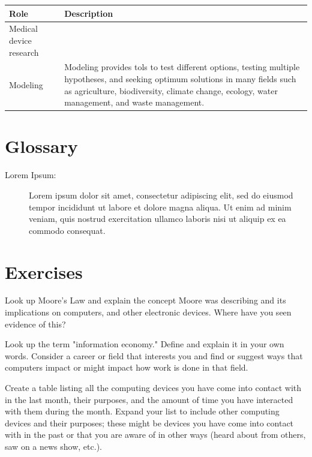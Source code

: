 \begin{table}[H]
	\begin{center}
		\begin{tabular}{p{1.3in}|p{3in}} 
			\textbf{Role} & \textbf{Description}\\
			\hline
			Medical device research & \\
			\hline
			Modeling & Modeling provides tols to test different options, testing multiple hypotheses, and seeking optimum solutions in many fields such as agriculture, biodiversity, climate change, ecology, water management, and waste management.\\
		\end{tabular}
	\end{center}
\end{table}

\section{Glossary}

\begin{description}
	
	\item[Lorem Ipsum:]  Lorem ipsum dolor sit amet, consectetur adipiscing elit, sed do eiusmod tempor incididunt ut labore et dolore magna aliqua. Ut enim ad minim veniam, quis nostrud exercitation ullamco laboris nisi ut aliquip ex ea commodo consequat.
	
\end{description}

\section{Exercises}

\begin{ex}
	Look up Moore's Law and explain the concept Moore was describing and its implications on computers, and other electronic devices. Where have you seen evidence of this?	
\end{ex}
\begin{ex}
	Look up the term "information economy." Define and explain it in your own words. Consider a career or field that interests you and find or suggest ways that computers impact or might impact how work is done in that field.
\end{ex}
\begin{ex}
	Create a table listing all the computing devices you have come into contact with in the last month, their purposes, and the amount of time you have interacted with them during the month. Expand your list to include other computing devices and their purposes; these might be devices you have come into contact with in the past or that you are aware of in other ways (heard about from others, saw on a news show, etc.).
\end{ex}
